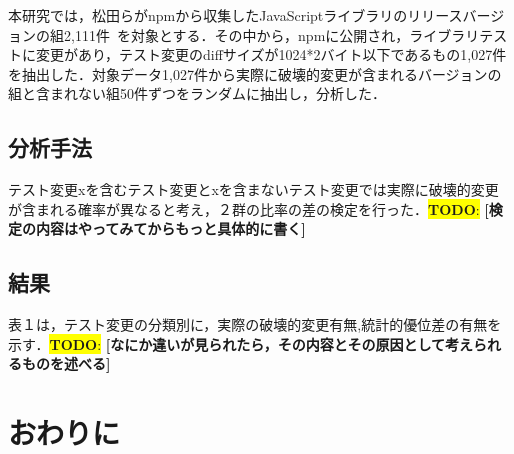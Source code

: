 \documentclass[uplatex,dvipdfmx,a4paper,twocolumn,base=11pt,jbase=11pt,ja=standard]{bxjsarticle}  %
\newcommand{\todo}[1]{\colorbox{yellow}{{\bf TODO}:}{\color{red} {\textbf{[#1]}}}}
\begin{document}
本研究では，松田らがnpmから収集したJavaScriptライブラリのリリースバージョンの組2,111件~\cite{FOSE2021_Matsuda}を対象とする．その中から，npmに公開され，ライブラリテストに変更があり，テスト変更のdiffサイズが1024*2バイト以下であるもの1,027件を抽出した．対象データ1,027件から実際に破壊的変更が含まれるバージョンの組と含まれない組50件ずつをランダムに抽出し，分析した．

\subsection{分析手法}

テスト変更xを含むテスト変更とxを含まないテスト変更では実際に破壊的変更が含まれる確率が異なると考え，２群の比率の差の検定を行った．\todo{検定の内容はやってみてからもっと具体的に書く}

\subsection{結果}

表１は，テスト変更の分類別に，実際の破壊的変更有無,統計的優位差の有無を示す．\todo{なにか違いが見られたら，その内容とその原因として考えられるものを述べる}

\begin{table}[t]
    \vspace{0mm}
    \centering
    \caption{\todo{こういうイメージの表を作る}}
    \label{table_test_change}
\end{table}

\section{おわりに}
\end{document}
